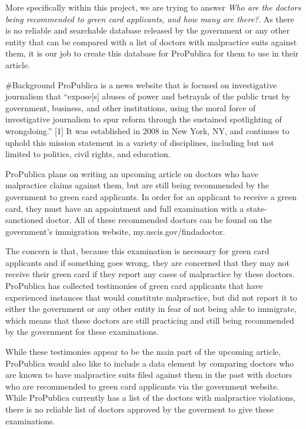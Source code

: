 \documentclass[10pt,letterpaper]{article}
\begin{document}
More specifically within this project, we are trying to answer \emph{Who
are the doctors being recommended to green card applicants, and how many
are there?}. As there is no reliable and searchable database released by
the government or any other entity that can be compared with a list of
doctors with malpractice suits against them, it is our job to create
this database for ProPublica for them to use in their article.

\#Background ProPublica is a news website that is focused on
investigative journalism that ``expose{[}s{]} abuses of power and
betrayals of the public trust by government, business, and other
institutions, using the moral force of investigative journalism to spur
reform through the sustained spotlighting of wrongdoing.'' {[}1{]} It
was established in 2008 in New York, NY, and continues to uphold this
mission statement in a variety of disciplines, including but not limited
to politics, civil rights, and education.

ProPublica plans on writing an upcoming article on doctors who have
malpractice claims against them, but are still being recommended by the
government to green card applicants. In order for an applicant to
receive a green card, they must have an appointment and full examination
with a state-sanctioned doctor. All of these recommended doctors can be
found on the government's immigration website, my.uscis.gov/findadoctor.

The concern is that, because this examination is necessary for green
card applicants and if something goes wrong, they are concerned that
they may not receive their green card if they report any cases of
malpractice by these doctors. ProPublica has collected testimonies of
green card applicants that have experienced instances that would
constitute malpractice, but did not report it to either the government
or any other entity in fear of not being able to immigrate, which means
that these doctors are still practicing and still being recommended by
the government for these examinations.

While these testimonies appear to be the main part of the upcoming
article, ProPublica would also like to include a data element by
comparing doctors who are known to have malpractice suits filed against
them in the past with doctors who are recommended to green card
applicants via the government website. While ProPublica currently has a
list of the doctors with malpractice violations, there is no reliable
list of doctors approved by the goverment to give these examinations.
\end{document}
